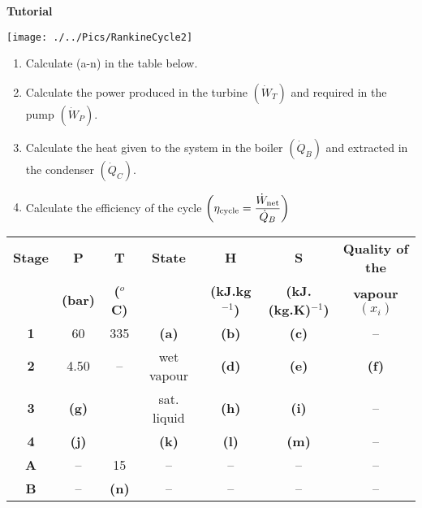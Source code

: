 \begin{MyTutorial}{\begin{center}{\bf Tutorial}\end{center}}
\begin{problem}
\begin{center}
\texttt{[image: ./../Pics/RankineCycle2]}
\label{exam_mod02_rankinecycle}
\end{center}
\begin{enumerate}
\item Calculate (a-n) in the table below.
\item Calculate the power produced in the turbine $\left(\dot{W}_{T}\right)$ and required in the pump $\left(\dot{W}_{P}\right)$.
\item Calculate the heat given to the system in the boiler $\left(\dot{Q}_{B}\right)$ and extracted in the condenser $\left(\dot{Q}_{C}\right)$.
\item Calculate the efficiency of the cycle $\left(\eta_{\text{cycle}}=\displaystyle\frac{\dot{W}_{\text{net}}}{\dot{Q}_{B}}\right)$
\end{enumerate}
\begin{center}
\begin{tabular} {||c | c c c c c c || }
\hline\hline
{\bf Stage} & {\bf P}    & {\bf T}        & {\bf State}    & {\bf H}             & {\bf S}                 &  {\bf Quality of the} \\
            & {\bf (bar)}& {\bf ($^{o}$C)} &               & {\bf (kJ.kg$^{-1}$)} & {\bf (kJ.(kg.K)$^{-1}$)} &  {\bf vapour $\left(x_{i}\right)$} \\
\hline\hline
 {\bf 1 }   & 60         & 335            &   {\bf (a)}    & {\bf (b)}           & {\bf (c)}               &   --          \\
 {\bf 2 }   & 4.50       &  --            &   wet vapour   & {\bf (d)}           & {\bf (e)}               &   {\bf (f)}    \\
 {\bf 3 }   & {\bf(g)}   &                &   sat. liquid  & {\bf (h)}           & {\bf (i)}               &   --            \\
 {\bf 4 }   & {\bf(j)}   &                &   {\bf (k)}    & {\bf (l)}           & {\bf (m)}               &   --            \\
 {\bf A }   & --         & 15             &   --           & --                  & --                      &   --     \\
 {\bf B }   & --         & {\bf (n)}      &   --           & --                  & --                      &   --         \\
 \hline\hline
\end{tabular}
\end{center}

  \end{problem}
%
  \begin{problem}
     
  \end{problem}
%
  \begin{problem}
     
  \end{problem}
%
\end{MyTutorial}
